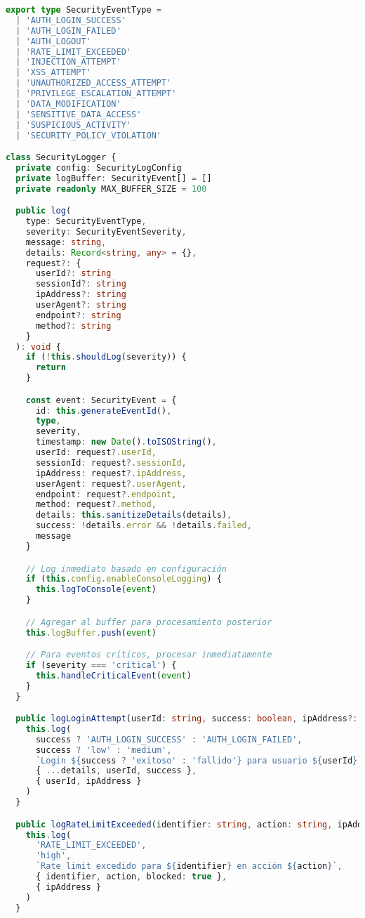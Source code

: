\documentclass[12pt,a4paper]{article}
\begin{document}
\begin{lstlisting}[language=TypeScript, caption=Sistema de Logging de Seguridad]
export type SecurityEventType =
  | 'AUTH_LOGIN_SUCCESS'
  | 'AUTH_LOGIN_FAILED'
  | 'AUTH_LOGOUT'
  | 'RATE_LIMIT_EXCEEDED'
  | 'INJECTION_ATTEMPT'
  | 'XSS_ATTEMPT'
  | 'UNAUTHORIZED_ACCESS_ATTEMPT'
  | 'PRIVILEGE_ESCALATION_ATTEMPT'
  | 'DATA_MODIFICATION'
  | 'SENSITIVE_DATA_ACCESS'
  | 'SUSPICIOUS_ACTIVITY'
  | 'SECURITY_POLICY_VIOLATION'

class SecurityLogger {
  private config: SecurityLogConfig
  private logBuffer: SecurityEvent[] = []
  private readonly MAX_BUFFER_SIZE = 100

  public log(
    type: SecurityEventType,
    severity: SecurityEventSeverity,
    message: string,
    details: Record<string, any> = {},
    request?: {
      userId?: string
      sessionId?: string
      ipAddress?: string
      userAgent?: string
      endpoint?: string
      method?: string
    }
  ): void {
    if (!this.shouldLog(severity)) {
      return
    }

    const event: SecurityEvent = {
      id: this.generateEventId(),
      type,
      severity,
      timestamp: new Date().toISOString(),
      userId: request?.userId,
      sessionId: request?.sessionId,
      ipAddress: request?.ipAddress,
      userAgent: request?.userAgent,
      endpoint: request?.endpoint,
      method: request?.method,
      details: this.sanitizeDetails(details),
      success: !details.error && !details.failed,
      message
    }

    // Log inmediato basado en configuración
    if (this.config.enableConsoleLogging) {
      this.logToConsole(event)
    }

    // Agregar al buffer para procesamiento posterior
    this.logBuffer.push(event)

    // Para eventos críticos, procesar inmediatamente
    if (severity === 'critical') {
      this.handleCriticalEvent(event)
    }
  }

  public logLoginAttempt(userId: string, success: boolean, ipAddress?: string, details: Record<string, any> = {}): void {
    this.log(
      success ? 'AUTH_LOGIN_SUCCESS' : 'AUTH_LOGIN_FAILED',
      success ? 'low' : 'medium',
      `Login ${success ? 'exitoso' : 'fallido'} para usuario ${userId}`,
      { ...details, userId, success },
      { userId, ipAddress }
    )
  }

  public logRateLimitExceeded(identifier: string, action: string, ipAddress?: string): void {
    this.log(
      'RATE_LIMIT_EXCEEDED',
      'high',
      `Rate limit excedido para ${identifier} en acción ${action}`,
      { identifier, action, blocked: true },
      { ipAddress }
    )
  }


\end{lstlisting}
\end{document}
